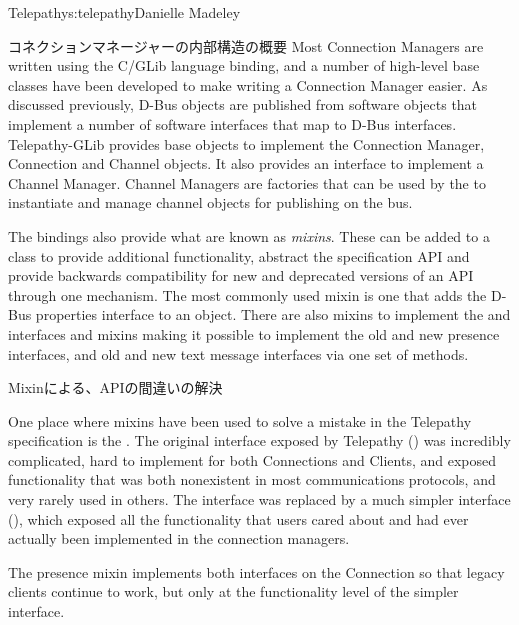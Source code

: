 \begin{aosachapter}{Telepathy}{s:telepathy}{Danielle Madeley}
\begin{aosasect1}{コネクションマネージャーの内部構造の概要}
Most Connection Managers are written using the C/GLib language
binding, and a number of high-level base classes have been developed
to make writing a Connection Manager easier.  As discussed previously,
D-Bus objects are published from software objects that implement a
number of software interfaces that map to D-Bus
interfaces. Telepathy-GLib provides base objects to implement the
Connection Manager, Connection and Channel objects. It also provides
an interface to implement a Channel Manager. Channel Managers are
factories that can be used by the  to instantiate
and manage channel objects for publishing on the bus.

The bindings also provide what are known as \emph{mixins}.  These can
be added to a class to provide additional functionality, abstract the
specification API and provide backwards compatibility for new and
deprecated versions of an API through one mechanism. The most commonly
used mixin is one that adds the D-Bus properties interface to an
object. There are also mixins to implement the
 and
 interfaces and mixins making it
possible to implement the old and new presence interfaces, and old and
new text message interfaces via one set of methods.


\begin{aosabox}{Mixinによる、APIの間違いの解決}

One place where mixins have been used to solve a mistake in the
Telepathy specification is the .  The original
interface exposed by Telepathy
() was incredibly
complicated, hard to implement for both Connections and Clients, and
exposed functionality that was both nonexistent in most communications
protocols, and very rarely used in others. The interface was replaced
by a much simpler interface
(), which exposed all
the functionality that users cared about and had ever actually been
implemented in the connection managers.

The presence mixin implements both interfaces on the Connection so
that legacy clients continue to work, but only at the functionality
level of the simpler interface.


\end{aosabox}
\end{aosasect1}
\end{aosachapter}
